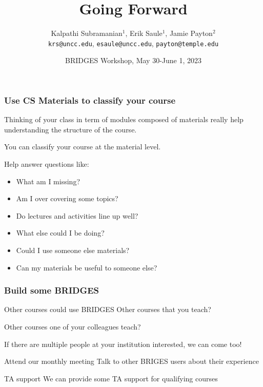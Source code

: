 \documentclass[aspectratio=169]{beamer}
\title{Going Forward}
\subtitle{}
\author{Kalpathi Subramanian$^1$, Erik Saule$^1$, Jamie Payton$^2$\\\texttt{krs@uncc.edu}, \texttt{esaule@uncc.edu}, \texttt{payton@temple.edu} }
\institute{$^1$The University of North Carolina at Charlotte\\$^2$Temple University}
\date{BRIDGES Workshop, May 30-June 1, 2023}
\begin{document}
\begin{frame}
\titlepage
\end{frame}



\begin{frame}
  \frametitle{Use CS Materials to classify your course}

  Thinking of your class in term of modules composed of materials really help understanding the structure of the course.

  You can classify your course at the material level.

  Help answer questions like:
  \begin{itemize}
  \item What am I missing?
  \item Am I over covering some topics?
  \item Do lectures and activities line up well?
  \item What else could I be doing?
  \item Could I use someone else materials?
  \item Can my materials be useful to someone else?
  \end{itemize}
\end{frame}

\begin{frame}
  \frametitle{Build some BRIDGES}
  \begin{block}{Other courses could use BRIDGES}
    Other courses that you teach?

    Other courses one of your colleagues teach?

    If there are multiple people at your institution interested, we can come too!
  \end{block}

  \begin{block}{Attend our monthly meeting}
    Talk to other BRIGES users about their experience
  \end{block}

  \begin{block}{TA support}
    We can provide some TA support for qualifying courses
  \end{block}
\end{frame}
\end{document}
